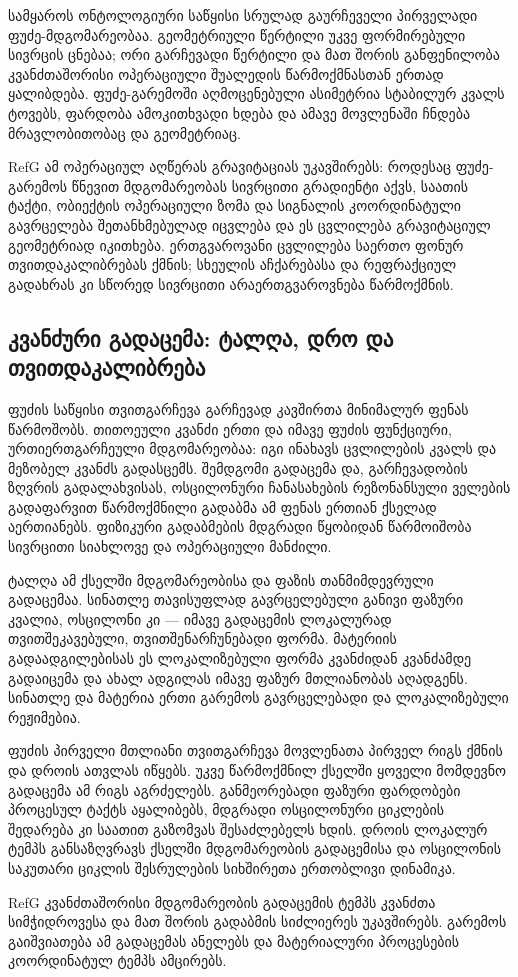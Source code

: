 \documentclass[11pt,a4paper]{article}
\begin{document}
სამყაროს ონტოლოგიური საწყისი სრულად გაურჩეველი პირველადი ფუძე-მდგომარეობაა. გეომეტრიული წერტილი უკვე ფორმირებული სივრცის ცნებაა; ორი გარჩევადი წერტილი და მათ შორის განფენილობა კვანძთაშორისი ოპერაციული შუალედის წარმოქმნასთან ერთად ყალიბდება. ფუძე-გარემოში აღმოცენებული ასიმეტრია სტაბილურ კვალს ტოვებს, ფარდობა ამოკითხვადი ხდება და ამავე მოვლენაში ჩნდება მრავლობითობაც და გეომეტრიაც.

RefG ამ ოპერაციულ აღწერას გრავიტაციას უკავშირებს: როდესაც ფუძე-გარემოს წნევით მდგომარეობას სივრცითი გრადიენტი აქვს, საათის ტაქტი, ობიექტის ოპერაციული ზომა და სიგნალის კოორდინატული გავრცელება შეთანხმებულად იცვლება და ეს ცვლილება გრავიტაციულ გეომეტრიად იკითხება. ერთგვაროვანი ცვლილება საერთო ფონურ თვითდაკალიბრებას ქმნის; სხეულის აჩქარებასა და რეფრაქციულ გადახრას კი სწორედ სივრცითი არაერთგვაროვნება წარმოქმნის.


\subsection{კვანძური გადაცემა: ტალღა, დრო და თვითდაკალიბრება}

ფუძის საწყისი თვითგარჩევა გარჩევად კავშირთა მინიმალურ ფენას წარმოშობს. თითოეული კვანძი ერთი და იმავე ფუძის ფუნქციური, ურთიერთგარჩეული მდგომარეობაა: იგი ინახავს ცვლილების კვალს და მეზობელ კვანძს გადასცემს. შემდგომი გადაცემა და, გარჩევადობის ზღვრის გადალახვისას, ოსცილონური ჩანასახების რეზონანსული ველების გადაფარვით წარმოქმნილი გადაბმა ამ ფენას ერთიან ქსელად აერთიანებს. ფიზიკური გადაბმების მდგრადი წყობიდან წარმოიშობა სივრცითი სიახლოვე და ოპერაციული მანძილი.

ტალღა ამ ქსელში მდგომარეობისა და ფაზის თანმიმდევრული გადაცემაა. სინათლე თავისუფლად გავრცელებული განივი ფაზური კვალია, ოსცილონი კი — იმავე გადაცემის ლოკალურად თვითშეკავებული, თვითშენარჩუნებადი ფორმა. მატერიის გადაადგილებისას ეს ლოკალიზებული ფორმა კვანძიდან კვანძამდე გადაიცემა და ახალ ადგილას იმავე ფაზურ მთლიანობას აღადგენს. სინათლე და მატერია ერთი გარემოს გავრცელებადი და ლოკალიზებული რეჟიმებია.

ფუძის პირველი მთლიანი თვითგარჩევა მოვლენათა პირველ რიგს ქმნის და დროის ათვლას იწყებს. უკვე წარმოქმნილ ქსელში ყოველი მომდევნო გადაცემა ამ რიგს აგრძელებს. განმეორებადი ფაზური ფარდობები პროცესულ ტაქტს აყალიბებს, მდგრადი ოსცილონური ციკლების შედარება კი საათით გაზომვას შესაძლებელს ხდის. დროის ლოკალურ ტემპს განსაზღვრავს ქსელში მდგომარეობის გადაცემისა და ოსცილონის საკუთარი ციკლის შესრულების სიხშირეთა ერთობლივი დინამიკა.

RefG კვანძთაშორისი მდგომარეობის გადაცემის ტემპს კვანძთა სიმჭიდროვესა და მათ შორის გადაბმის სიძლიერეს უკავშირებს. გარემოს გაიშვიათება ამ გადაცემას ანელებს და მატერიალური პროცესების კოორდინატულ ტემპს ამცირებს.
\end{document}
